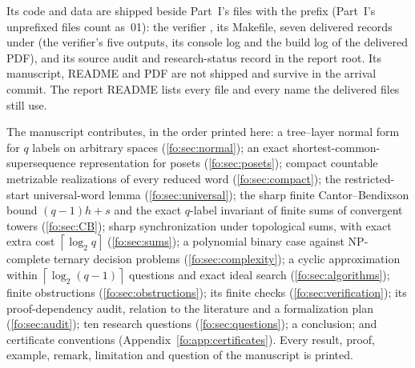\documentclass[11pt,letterpaper]{article}
\numberwithin{equation}{section}
\theoremstyle{definition}
\theoremstyle{remark}
\theoremstyle{definition}
\newcommand{\ceil}[1]{\left\lceil#1\right\rceil}
\begin{document}
Its code and data are shipped beside Part~I's files with the prefix
 (Part~I's unprefixed files count as~01): the
verifier , its Makefile, seven delivered
records under  (the verifier's five outputs, its console log and
the build log of the delivered PDF), and its source audit and research-status record
in the report root. Its manuscript, README and PDF are not shipped and survive
in the arrival commit. The report README lists every file and every name the
delivered files still use.

The manuscript contributes, in the order printed here: a tree--layer normal
form for $q$ labels on arbitrary spaces (\cref{fo:sec:normal}); an exact
shortest-common-supersequence representation for posets
(\cref{fo:sec:posets}); compact countable metrizable realizations of every
reduced word (\cref{fo:sec:compact}); the restricted-start universal-word
lemma (\cref{fo:sec:universal}); the sharp finite Cantor--Bendixson bound
$(q-1)h+s$ and the exact $q$-label invariant of finite sums of convergent
towers (\cref{fo:sec:CB}); sharp synchronization under topological sums, with
exact extra cost $\ceil{\log_2q}$ (\cref{fo:sec:sums}); a polynomial binary
case against NP-complete ternary decision problems (\cref{fo:sec:complexity});
a cyclic approximation within $\ceil{\log_2(q-1)}$ questions and exact ideal
search (\cref{fo:sec:algorithms}); finite obstructions
(\cref{fo:sec:obstructions}); its finite checks (\cref{fo:sec:verification});
its proof-dependency audit, relation to the literature and a formalization
plan (\cref{fo:sec:audit}); ten research questions
(\cref{fo:sec:questions}); a conclusion; and certificate conventions
(Appendix~\ref{fo:app:certificates}). Every result, proof, example, remark,
limitation and question of the manuscript is printed.
\end{document}
